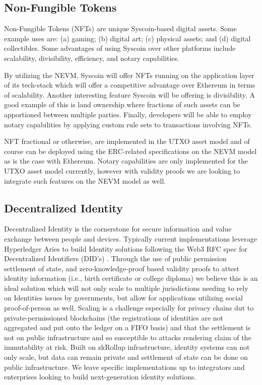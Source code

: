 \documentclass[peerreview]{ieeesyscoin}
\begin{document}
\subsection{Non-Fungible Tokens}

Non-Fungible Tokens (NFTs) are unique Syscoin-based digital assets. Some example uses are: (a) gaming; (b) digital art; (c) physical assets; and (d) digital collectibles. Some advantages of using Syscoin over other platforms include scalability, divisibility, efficiency, and notary capabilities. 

By utilizing the NEVM, Syscoin will offer NFTs running on the application layer of its tech-stack which will offer a competitive advantage over Ethereum in terms of scalability. Another interesting feature Syscoin will be offering is divisibility. A good example of this is land ownership where fractions of such assets can be apportioned between multiple parties. Finally, developers will be able to employ notary capabilities by applying custom rule sets to transactions involving NFTs.

NFT fractional or otherwise, are implemented in the UTXO asset model and of course can be deployed using the ERC-related specifications on the NEVM model as is the case with Ethereum. Notary capabilities are only implemented for the UTXO asset model currently, however with validity proofs we are looking to integrate such features on the NEVM model as well.

\subsection{Decentralized Identity}
Decentralized Identity is the cornerstone for secure information and value exchange between people and devices. Typically current implementations leverage Hyperledger Aries to build Identity solutions following the Web3 RFC spec for Decentralized Identifiers (DID's) \cite{DID}. Through the use of public permission settlement of state, and zero-knowledge-proof based validity proofs to attest identity information (i.e., birth certificate or college diploma) we believe this is an ideal solution which will not only scale to multiple jurisdictions needing to rely on Identities issues by governments, but allow for applications utilizing  social proof-of-person as well. Scaling is a challenge especially for privacy chains dut to private-permissioned blockchains (the registrations of identities are not aggregated and put onto the ledger on a FIFO basis) and that the settlement is not on public infrastructure and so susceptible to attacks rendering claim of the immutability at risk. Built on zkRollup infrastructure, identity systems can not only scale, but data can remain private and settlement of state can be done on public infrastructure. We leave specific implementations up to integrators and enterprises looking to build next-generation identity solutions.
\end{document}
